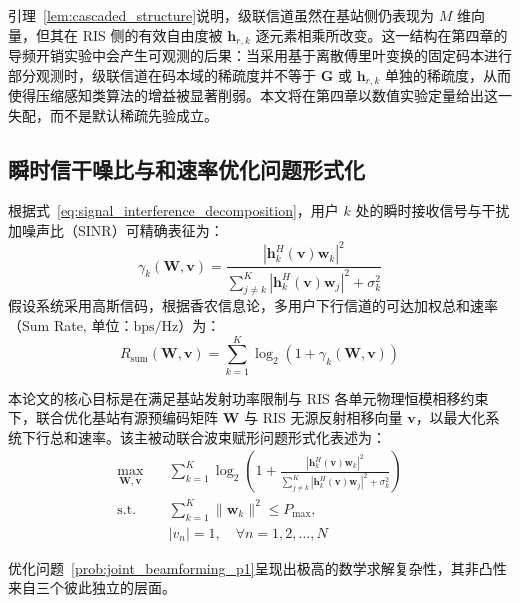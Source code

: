 引理~\ref{lem:cascaded_structure}说明，级联信道虽然在基站侧仍表现为 $M$ 维向量，但其在 RIS 侧的有效自由度被 $\bm{h}_{r,k}$ 逐元素相乘所改变。这一结构在第四章的导频开销实验中会产生可观测的后果：当采用基于离散傅里叶变换的固定码本进行部分观测时，级联信道在码本域的稀疏度并不等于 $\bm{G}$ 或 $\bm{h}_{r,k}$ 单独的稀疏度，从而使得压缩感知类算法的增益被显著削弱。本文将在第四章以数值实验定量给出这一失配，而不是默认稀疏先验成立。

\subsection{瞬时信干噪比与和速率优化问题形式化}
\label{sec:problem_formulation}

根据式~\eqref{eq:signal_interference_decomposition}，用户 $k$ 处的瞬时接收信号与干扰加噪声比（SINR）可精确表征为：
\begin{equation}
  \gamma_k(\bm{W}, \bm{v}) = \frac{|\bm{h}_k^H(\bm{v})\bm{w}_k|^2}{\sum_{j \neq k}^K |\bm{h}_k^H(\bm{v})\bm{w}_j|^2 + \sigma_k^2}
  \label{eq:sinr_formulation}
\end{equation}
假设系统采用高斯信码，根据香农信息论，多用户下行信道的可达加权总和速率（Sum Rate, 单位：$\mathrm{bps/Hz}$）为：
\begin{equation}
  R_{\mathrm{sum}}(\bm{W}, \bm{v}) = \sum_{k=1}^K \log_2\left( 1 + \gamma_k(\bm{W}, \bm{v}) \right)
  \label{eq:sum_rate_def}
\end{equation}

本论文的核心目标是在满足基站发射功率限制与 RIS 各单元物理恒模相移约束下，联合优化基站有源预编码矩阵 $\bm{W}$ 与 RIS 无源反射相移向量 $\bm{v}$，以最大化系统下行总和速率。该主被动联合波束赋形问题形式化表述为：
\begin{subequations}
  \label{prob:joint_beamforming_p1}
  \begin{align}
    \max_{\bm{W}, \bm{v}} \quad & \sum_{k=1}^K \log_2\left( 1 + \frac{|\bm{h}_k^H(\bm{v})\bm{w}_k|^2}{\sum_{j \neq k}^K |\bm{h}_k^H(\bm{v})\bm{w}_j|^2 + \sigma_k^2} \right) \label{prob:p1_obj} \\
    \text{s.t.} \quad & \sum_{k=1}^K \|\bm{w}_k\|^2 \le P_{\max}, \label{prob:p1_power} \\
                      & |v_n| = 1, \quad \forall n = 1, 2, \dots, N \label{prob:p1_unimodular}
  \end{align}
\end{subequations}

优化问题~\eqref{prob:joint_beamforming_p1}呈现出极高的数学求解复杂性，其非凸性来自三个彼此独立的层面。

